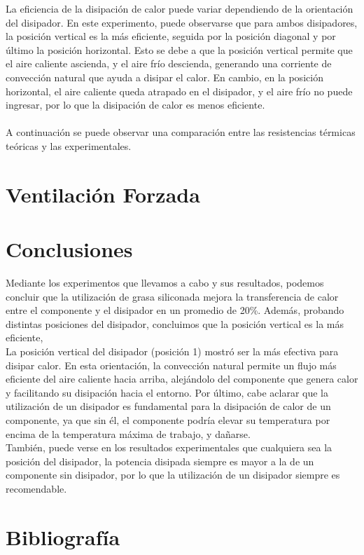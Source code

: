 \documentclass[conference]{IEEEtran}
\begin{document}
    La eficiencia de la disipación de calor puede variar dependiendo de la orientación del disipador. 
    En este experimento, puede observarse que para ambos disipadores, la posición vertical es la más eficiente,
    seguida por la posición diagonal y por último la posición horizontal. Esto se debe a que la posición vertical
    permite que el aire caliente ascienda, y el aire frío descienda, generando una corriente de convección natural
    que ayuda a disipar el calor. En cambio, en la posición horizontal, el aire caliente queda atrapado en el disipador,
    y el aire frío no puede ingresar, por lo que la disipación de calor es menos eficiente.\\ \\

    A continuación se puede observar una comparación entre las resistencias térmicas teóricas y las experimentales.




    \section{Ventilación Forzada}

    \section{Conclusiones}

    Mediante los experimentos que llevamos a cabo y sus resultados, podemos concluir que la utilización de grasa 
    siliconada mejora la transferencia de calor entre el componente y el disipador en un promedio de 20\%. Además,
    probando distintas posiciones del disipador, concluimos que la posición vertical es la más eficiente,
    \\La posición vertical del disipador (posición 1) mostró ser la más efectiva para disipar calor. En esta orientación, 
    la convección natural permite un flujo más eficiente del aire caliente hacia arriba, alejándolo del componente que 
    genera calor y facilitando su disipación hacia el entorno. Por último, cabe aclarar que la utilización de un
    disipador es fundamental para la disipación de calor de un componente, ya que sin él, el componente podría elevar
    su temperatura por encima de la temperatura máxima de trabajo, y dañarse. \\También, puede verse en los resultados
    experimentales que cualquiera sea la posición del disipador, la potencia disipada siempre es mayor a la de un
    componente sin disipador, por lo que la utilización de un disipador siempre es recomendable.

    \section{Bibliografía}
\end{document}
